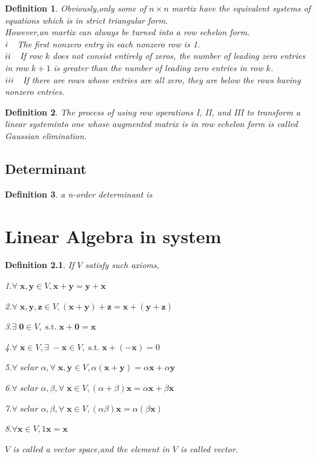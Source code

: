 \documentclass[a4paper,12pt]{report}
\newtheorem{definition}{Definition}[section]     %
\newcommand{\st}{\operatorname{s.t.}}
\begin{document}
\begin{definition}
    Obviously,only some of $n\times n$ martix have the equivalent systems of equations which is in strict triangular form.\\
    However,an martix can always be turned into a row echelon form.\\
    $\uppercase\expandafter{\romannumeral1}\quad$The first nonzero entry in each nonzero row is 1.\\
    $\uppercase\expandafter{\romannumeral2}\quad$If row $k$ does not consist entirely of zeros, the number of leading zero entries in row $k+1$ is greater than the number of leading zero entries in row $k$.\\
    $\uppercase\expandafter{\romannumeral3}\quad$If there are rows whose entries are all zero, they are below the rows having nonzero entries.\\
\end{definition}
\begin{definition}
    The process of using row operations I, II, and III to transform a linear systeminto one whose augmented matrix is in row echelon form is called Gaussian
elimination.
\end{definition}
\section{Determinant}
\begin{definition}
    a n-order determinant is 
\end{definition}
\chapter{Linear Algebra in system}
\begin{definition}
    If $V$ satisfy such axioms,

    1.$\forall\;\mathbf{x},\mathbf{y}\in V,\mathbf{x}+\mathbf{y}=\mathbf{y}+\mathbf{x}$
    
    2.$\forall\;\mathbf{x},\mathbf{y},\mathbf{z}\in V,(\mathbf{x}+\mathbf{y})+\mathbf{z}=\mathbf{x}+(\mathbf{y}+\mathbf{z})$

    3.$\exists\;\mathbf{0}\in V,\st \mathbf{x}+\mathbf{0}=\mathbf{x}$

    4.$\forall\;\mathbf{x}\in V,\exists\;-\mathbf{x}\in V,\st \mathbf{x}+(-\mathbf{x})=0$

    5.$\forall\;sclar\;\alpha,\forall\;\mathbf{x},\mathbf{y}\in V,\alpha(\mathbf{x}+\mathbf{y})=\alpha \mathbf{x}+\alpha \mathbf{y}$

    6.$\forall\;sclar\;\alpha,\beta,\forall\;\mathbf{x}\in V,(\alpha+\beta)\mathbf{x}=\alpha \mathbf{x}+\beta \mathbf{x}$

    7.$\forall\;sclar\;\alpha,\beta,\forall\;\mathbf{x}\in V,(\alpha\beta)\mathbf{x}=\alpha(\beta \mathbf{x})$

    8.$\forall \mathbf{x}\in V,1\mathbf{x}=\mathbf{x}$

    $V$ is called a vector space,and the element in $V$ is called vector.
\end{definition}
\end{document}
